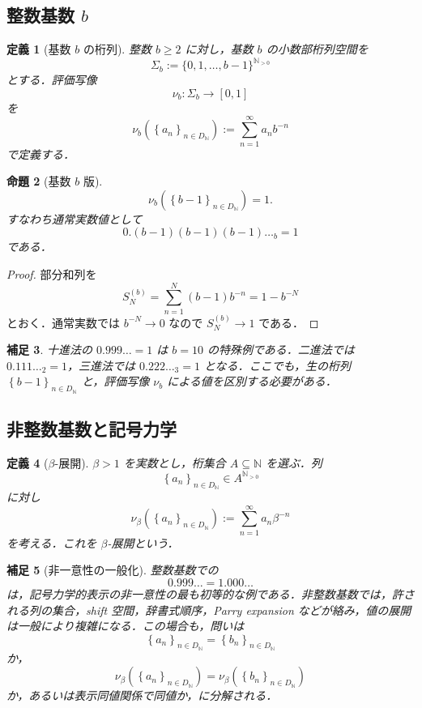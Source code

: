 \documentclass[a4paper,11pt]{ltjsarticle}
\theoremstyle{jpdef}
\newtheorem{definition}{定義}[section]
\newtheorem{remark}[definition]{補足}
\theoremstyle{jpthm}
\newtheorem{proposition}[definition]{命題}
\newcommand{\N}{\mathbb{N}}
\newcommand{\Ns}{\N_{>0}}
\newcommand{\DN}{D_{\N}}
\newcommand{\seq}[2]{\left\{#1\right\}_{#2}}
\begin{document}
\subsection{整数基数 \texorpdfstring{\(b\)}{b}}

\begin{definition}[基数 \(b\) の桁列]
整数 \(b\ge2\) に対し，基数 \(b\) の小数部桁列空間を
\[
  \Sigma_b:=\{0,1,\ldots,b-1\}^{\Ns}
\]
とする．評価写像
\[
  \nu_b:\Sigma_b\to[0,1]
\]
を
\[
  \nu_b(\seq{a_n}{n\in\DN})
  :=\sum_{n=1}^{\infty}a_nb^{-n}
\]
で定義する．
\end{definition}

\begin{proposition}[基数 \(b\) 版]
\[
  \nu_b(\seq{b-1}{n\in\DN})=1.
\]
すなわち通常実数値として
\[
  0.(b-1)(b-1)(b-1)\ldots_b=1
\]
である．
\end{proposition}

\begin{proof}
部分和列を
\[
  S_N^{(b)}=\sum_{n=1}^{N}(b-1)b^{-n}=1-b^{-N}
\]
とおく．通常実数では \(b^{-N}\to0\) なので \(S_N^{(b)}\to1\) である．
\end{proof}

\begin{remark}
十進法の \(0.999\ldots=1\) は \(b=10\) の特殊例である．二進法では \(0.111\ldots_2=1\)，三進法では \(0.222\ldots_3=1\) となる．ここでも，生の桁列 \(\seq{b-1}{n\in\DN}\) と，評価写像 \(\nu_b\) による値を区別する必要がある．
\end{remark}

\subsection{非整数基数と記号力学}

\begin{definition}[\(\beta\)-展開]
\(\beta>1\) を実数とし，桁集合 \(A\subseteq\N\) を選ぶ．列
\[
  \seq{a_n}{n\in\DN}\in A^{\Ns}
\]
に対し
\[
  \nu_\beta(\seq{a_n}{n\in\DN})
  :=\sum_{n=1}^{\infty}a_n\beta^{-n}
\]
を考える．これを \(\beta\)-展開という．
\end{definition}

\begin{remark}[非一意性の一般化]
整数基数での
\[
  0.999\ldots=1.000\ldots
\]
は，記号力学的表示の非一意性の最も初等的な例である．非整数基数では，許される列の集合，shift 空間，辞書式順序，Parry expansion などが絡み，値の展開は一般により複雑になる．この場合も，問いは
\[
  \seq{a_n}{n\in\DN}=\seq{b_n}{n\in\DN}
\]
か，
\[
  \nu_\beta(\seq{a_n}{n\in\DN})=\nu_\beta(\seq{b_n}{n\in\DN})
\]
か，あるいは表示同値関係で同値か，に分解される．
\end{remark}
\end{document}
